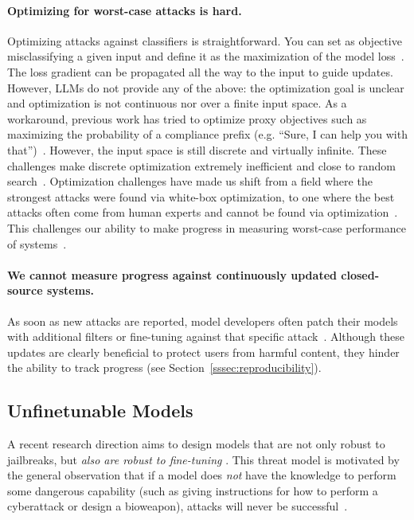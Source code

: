 \paragraph{Optimizing for worst-case attacks is hard.} Optimizing attacks against classifiers is straightforward. You can set as objective misclassifying a given input and define it as the maximization of the model loss~\citep{szegedy2013intriguing}.
The loss gradient can be propagated all the way to the input to guide updates. However, LLMs do not provide any of the above: the optimization goal is unclear and optimization is not continuous nor over a finite input space. As a workaround, previous work has tried to optimize proxy objectives such as maximizing the probability of a compliance prefix (e.g. ``Sure, I can help you with that'')~\citep{zou2023universal,carlini2024aligned}. However, the input space is still discrete and virtually infinite. These challenges make discrete optimization extremely inefficient and close to random search~\citep{zou2023universal,andriushchenko2024jailbreaking}. Optimization challenges have made us shift from a field where the strongest attacks were found via white-box optimization, to one where the best attacks often come from human experts and cannot be found via optimization~\citep{li2024llm}. This challenges our ability to make progress in measuring worst-case performance of systems~\citep{carlini2024aligned}.

\paragraph{We cannot measure progress against continuously updated closed-source systems.} As soon as new attacks are reported, model developers often patch their models with additional filters or fine-tuning against that specific attack~\citep{chao2024jailbreakbench}. Although these updates are clearly beneficial to protect users from harmful content, they hinder the ability to track progress (see Section~\ref{sssec:reproducibility}).%

\subsection{Unfinetunable Models} 
\label{sec:unfinetune}

A recent research direction aims to design models that are not only robust to jailbreaks,
but \emph{also are robust to fine-tuning} \cite{tamirisa2024tamper,rosati2024representation}.
This threat model is motivated by the general observation that if a model does \emph{not} have the knowledge to perform some dangerous capability (such as giving instructions for how to perform a cyberattack or design a bioweapon), attacks will never be successful~\citep{li2024wmdp}.

